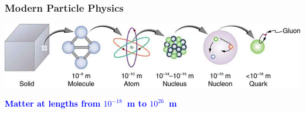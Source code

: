 \documentclass{beamer}
\begin{document}
\begin{frame}
\frametitle{\Huge{Modern Particle Physics}}
 \begin{minipage}[t]{\paperwidth}
     \mbox{\includegraphics[height=0.50\paperwidth, width=0.85\paperwidth]{THESISPLOTS/New-Physics-PLOTS/Matter-Content-Particle-Physics.jpg}}
    

\vspace{1cm}
 \textcolor{blue}{\textbf{Matter at lengths from $10^{-18}$~m to $10^{26}$~m}}
 
 \end{minipage}

\end{frame}
\end{document}
